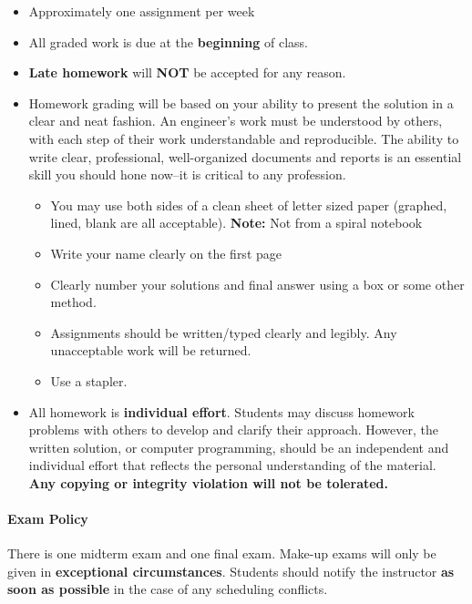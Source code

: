 \documentclass[11pt, reqno]{article}   	%
\begin{document}
\begin{itemize}
    \item Approximately one assignment per week
    \item All graded work is due at the \textbf{beginning} of class.
    \item \textbf{Late homework} will \textbf{NOT} be accepted for any reason.
    \item Homework grading will be based on your ability to present the solution in a clear and neat fashion.
    An engineer's work must be understood by others, with each step of their work understandable and reproducible. 
    The ability to write clear, professional, well-organized documents and reports is an essential skill you should hone now--it is critical to any profession.
    \begin{itemize}
        \item You may use both sides of a clean sheet of letter sized paper (graphed, lined, blank are all acceptable).
        \textbf{Note:} Not from a spiral notebook
        \item Write your name clearly on the first page
        \item Clearly number your solutions and final answer using a box or some other method.
        \item Assignments should be written/typed clearly and legibly. 
        Any unacceptable work will be returned.
        \item Use a stapler.
    \end{itemize}
    \item All homework is \textbf{individual effort}.
    Students may discuss homework problems with others to develop and clarify their approach.
    However, the written solution, or computer programming, should be an independent and individual effort that reflects the personal understanding of the material.
    \textbf{Any copying or integrity violation will not be tolerated.}
\end{itemize}

\paragraph{Exam Policy}
There is one midterm exam and one final exam. 
Make-up exams will only be given in \textbf{exceptional circumstances}.
Students should notify the instructor \textbf{as soon as possible} in the case of any scheduling conflicts.
\end{document}

